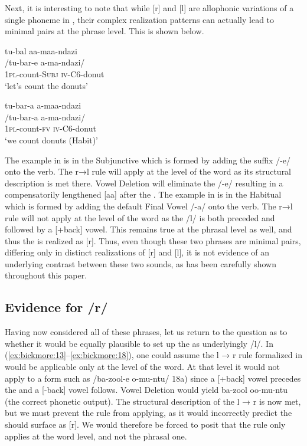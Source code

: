 \documentclass[output=paper,modfonts,nonflat,
 hidelinks
]{langsci/langscibook}
\begin{document}
Next, it is interesting to note that while [r] and [l] are allophonic variations of a single phoneme in , their complex realization%
%
 patterns can actually lead to minimal pairs at the phrase level. This is shown below.

\ea\label{ex:bickmore:22}
\glll    tu-bal aa-maa-ndazi\\
    /tu-bar-e a-ma-ndazi/	\\
\textsc{1pl-}\textup{count}\textsc{{}-Subj} \textsc{iv-C6-}\textup{donut}\\
\glt    ‘let’s count the donuts’
\z

\ea\label{ex:bickmore:23}
\glll    tu-bar-a a-maa-ndazi\\
    /tu-bar-a a-ma-ndazi/	\\
\textsc{1pl-}\textup{count}\textsc{{}-fv} \textsc{iv-C6-}\textup{donut}\\
\glt    ‘we count donuts (Habit)’
\z


The example in  is in the Subjunctive which is formed by adding the suffix /-e/ onto the verb. The r→l rule will apply at the level of the word as its structural description is met there. Vowel Deletion will eliminate the /-e/ resulting in a compensatorily lengthened [aa] after the . The example in  is in the Habitual which is formed by adding the default Final Vowel /-a/ onto the verb. The r→l rule will not apply at the level of the word as the /l/ is both preceded and followed by a [+back] vowel. This remains true at the phrasal level as well, and thus the  is realized as [r]. Thus, even though these two phrases are minimal pairs, differing only in distinct realizations of [r] and [l], it is not evidence of an underlying contrast between these two sounds, as has been carefully shown throughout this paper.

\subsection{Evidence for /r/}\label{sec:bickmore:2.3}

Having now considered all of these phrases, let us return to the question as to whether it would be equally plausible to set up the  as underlyingly /l/. In (\ref{ex:bickmore:13}--\ref{ex:bickmore:18}), one could assume the l → r rule formalized in  would be applicable only at the level of the word. At that level it would not apply to a form such as /ba-zool-e o-mu-ntu/ 18a) since a [+back] vowel precedes the  and a [-back] vowel follows. Vowel Deletion would yield ba-zool oo-mu-ntu (the correct phonetic output). The structural description of the l → r is now met, but we must prevent the rule from applying, as it would incorrectly predict the  should surface as [r]. We would therefore be forced to posit that the rule only applies at the word level, and not the phrasal one.
\end{document}
